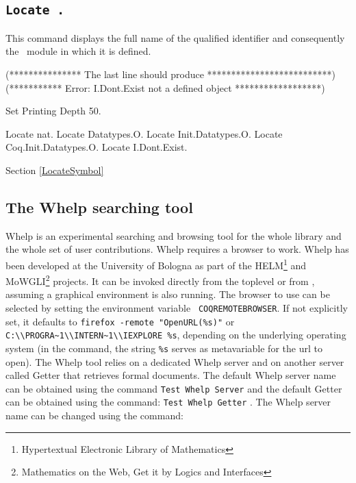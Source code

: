 
\subsection[\tt Locate {\qualid}.]{\tt Locate {\qualid}.
\label{Locate}}
This command displays the full name of the qualified identifier {\qualid}
and consequently the \Coq\ module in which it is defined.

\begin{coq_eval}
(*************** The last line should produce **************************)
(*********** Error: I.Dont.Exist not a defined object ******************)
\end{coq_eval}
\begin{coq_eval}
Set Printing Depth 50.
\end{coq_eval}
\begin{coq_example}
Locate nat.
Locate Datatypes.O.
Locate Init.Datatypes.O.
Locate Coq.Init.Datatypes.O.
Locate I.Dont.Exist.
\end{coq_example}

\SeeAlso Section \ref{LocateSymbol}

\subsection{The {\sc Whelp} searching tool
\label{Whelp}}

{\sc Whelp} is an experimental searching and browsing tool for the
whole {\Coq} library and the whole set of {\Coq} user contributions.
{\sc Whelp} requires a browser to work. {\sc Whelp} has been developed
at the University of Bologna as part of the HELM\footnote{Hypertextual
Electronic Library of Mathematics} and MoWGLI\footnote{Mathematics on
the Web, Get it by Logics and Interfaces} projects.  It can be invoked
directly from the {\Coq} toplevel or from {\CoqIDE}, assuming a
graphical environment is also running. The browser to use can be
selected by setting the environment variable {\tt
COQREMOTEBROWSER}. If not explicitly set, it defaults to
\verb!firefox -remote "OpenURL(%s)"!  or
\verb!C:\\PROGRA~1\\INTERN~1\\IEXPLORE %s!, depending on the
underlying operating system (in the command, the string \verb!%s!
serves as metavariable for the url to open).
The Whelp tool relies on a dedicated Whelp server and on another server
called Getter that retrieves formal documents. The default Whelp server name
can be obtained using the command {\tt Test Whelp Server}
 and the default Getter can be obtained
using the command: {\tt Test Whelp Getter} . The Whelp server name can be changed using the command:

